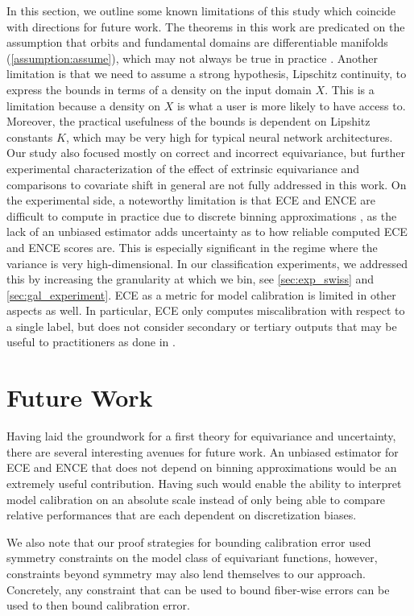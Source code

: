 \documentclass[10pt]{article} %
\theoremstyle{definition}
\begin{document}
In this section, we outline some known limitations of this study which coincide with directions for future work. The theorems in this work are predicated on the assumption that orbits and fundamental domains are differentiable manifolds (\cref{assumption:assume}), which may not always be true in practice \citep{dym2024equivariant}. Another limitation is that we need to assume a strong hypothesis, Lipschitz continuity, to express the bounds in terms of a density on the input domain $X$. This is a limitation because a density on $X$ is what a user is more likely to have access to. Moreover, the practical usefulness of the bounds is dependent on Lipshitz constants $K$, which may be very high for typical neural network architectures. Our study also focused mostly on correct and incorrect equivariance, but further experimental characterization of the effect of extrinsic equivariance and comparisons to covariate shift in general are not fully addressed in this work. On the experimental side, a noteworthy limitation is that ECE and ENCE are difficult to compute in practice due to discrete binning approximations \citep{pernot2023properties}, as the lack of an unbiased estimator adds uncertainty as to how reliable computed ECE and ENCE scores are. This is especially significant in the regime where the variance is very high-dimensional. In our classification experiments, we addressed this by increasing the granularity at which we bin, see \cref{sec:exp_swiss} and \cref{sec:gal_experiment}. ECE as a metric for model calibration is limited in other aspects as well. In particular, ECE only computes miscalibration with respect to a single label, but does not consider secondary or tertiary outputs that may be useful to practitioners as done in \cite{nixon2019measuring}. 

\section{Future Work}

Having laid the groundwork for a first theory for equivariance and uncertainty, there are several interesting avenues for future work. An unbiased estimator for ECE and ENCE that does not depend on binning approximations would be an extremely useful contribution. Having such would enable the ability to interpret model calibration on an absolute scale instead of only being able to compare relative performances that are each dependent on discretization biases.  

We also note that our proof strategies for bounding calibration error used symmetry constraints on the model class of equivariant functions, however, constraints beyond symmetry may also lend themselves to our approach. Concretely, any constraint that can be used to bound fiber-wise errors can be used to then bound calibration error. 
\end{document}
